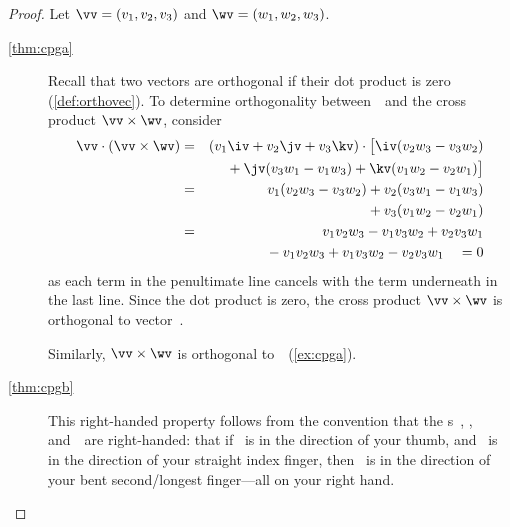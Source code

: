 \begin{proof} 
Let \(\vv=(v_1,v_2,v_3)\) and \(\wv=(w_1,w_2,w_3)\).

\begin{description}
\item[\ref{thm:cpga}] Recall that two vectors are orthogonal if their dot product is zero (\cref{def:orthovec}).
To determine orthogonality between~\vv\ and the cross product \(\vv\times\wv\), consider
\begin{eqnarray*}
\vv\cdot(\vv\times\wv)
&=&(v_1\iv+v_2\jv+v_3\kv)
\cdot\big[\iv(v_2w_3-v_3w_2)
\\&&{}
+\jv(v_3w_1-v_1w_3)
+\kv(v_1w_2-v_2w_1)\big]
\\&=&v_1(v_2w_3-v_3w_2)
+v_2(v_3w_1-v_1w_3)
\\&&{}
+v_3(v_1w_2-v_2w_1)
\\&=&v_1v_2w_3-v_1v_3w_2
+v_2v_3w_1
\\&&{}
-v_1v_2w_3
+v_1v_3w_2-v_2v_3w_1
\quad{}=0
\end{eqnarray*}
as each term in the penultimate line cancels with the term underneath in the last line.
Since the dot product is zero, the cross product \(\vv\times\wv\) is orthogonal to vector~\vv.

Similarly, \(\vv\times\wv\) is orthogonal to~\wv\  (\cref{ex:cpga}).

\item[\ref{thm:cpgb}] This right-handed property follows from the convention that the s~\iv, \jv, and~\kv\ are right-handed: that if \iv~is in the direction of your thumb, and \jv~is in the direction of your straight index finger, then \kv~is in the direction of your bent second\slash longest finger---all on your right hand.


\end{description}
\end{proof}

